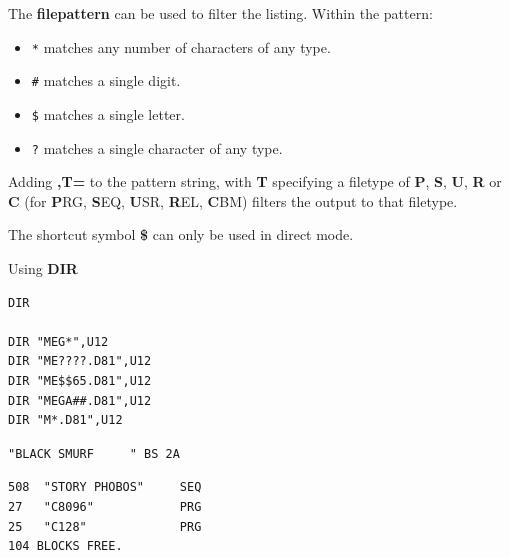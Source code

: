 \begin{description}[leftmargin=2cm,style=nextline]
                  The {\bf filepattern} can be used to filter the listing. Within the pattern:
                  \begin{itemize}
                     \item \texttt{*} matches any number of characters of any type.
                     \item \texttt{\#} matches a single digit.
                     \item \texttt{\$} matches a single letter.
                     \item \texttt{?} matches a single character of any type.
                  \end{itemize}

                  Adding {\bf ,T=} to the pattern string, with {\bf T} specifying a filetype of {\bf P}, {\bf S}, {\bf U}, {\bf R} or {\bf C} (for {\bf P}RG, {\bf S}EQ, {\bf U}SR, {\bf R}EL, {\bf C}BM) filters the output to that filetype.

                  The shortcut symbol {\bf \$} can only be used in direct mode.

\item [Example:]  Using {\bf DIR}

\begin{tcolorbox}[colback=black,coltext=white]
\verbatimfont{\codefont}
\begin{verbatim}
DIR

DIR "MEG*",U12
DIR "ME????.D81",U12
DIR "ME$$65.D81",U12
DIR "MEGA##.D81",U12
DIR "M*.D81",U12
\end{verbatim}

\selectfont{\codefont 0}
\begin{tcolorbox}[colback=white,coltext=black,arc=0mm,boxrule=0mm,
       left*=0.5mm,right*=0mm,top=0mm,bottom=0mm,nobeforeafter,
       left skip=0.5mm,
       width=28mm,height=3mm,valign=center]
\begin{verbatim}
"BLACK SMURF     " BS 2A
\end{verbatim}
\end{tcolorbox}
\begin{verbatim}
508  "STORY PHOBOS"     SEQ
27   "C8096"            PRG
25   "C128"             PRG
104 BLOCKS FREE.
\end{verbatim}
\end{tcolorbox}
\end{description}


\newpage
